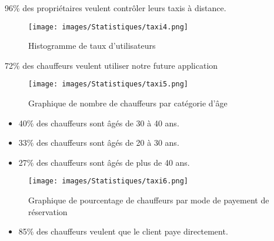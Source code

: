 {\begin{minipage}[c]{.65\linewidth}
 \end{minipage}\hfill
\begin{minipage}[c]{.35\linewidth}
96\% des propriétaires veulent contrôler leurs taxis à distance.
\end{minipage}



\begin{minipage}[c]{.6\linewidth}
\begin{figure}[H]
\centering
\texttt{[image: images/Statistiques/taxi4.png]}
\caption{Histogramme de taux d'utilisateurs}
\end{figure}

 \end{minipage}\hfill
\begin{minipage}[c]{.4\linewidth}
72\%  des chauffeurs veulent utiliser notre future application
\end{minipage}


\begin{minipage}[c]{.6\linewidth}
\begin{figure}[H]
\centering
\texttt{[image: images/Statistiques/taxi5.png]}
\caption{Graphique de nombre de chauffeurs par catégorie d'âge}
\end{figure}
 \end{minipage}\hfill
\begin{minipage}[c]{.4\linewidth}
\begin{itemize}
\item 40\% des chauffeurs sont âgés de 30 à 40 ans.

\item 33\% des chauffeurs sont âgés de 20 à 30 ans.

\item 27\% des chauffeurs sont âgés de plus de 40 ans.
\end{itemize}
\end{minipage}



\begin{minipage}[c]{.6\linewidth}
\begin{figure}[H]
\centering
\texttt{[image: images/Statistiques/taxi6.png]}
\caption{Graphique de pourcentage de chauffeurs par mode de payement de réservation}
\end{figure}
 \end{minipage}\hfill
\begin{minipage}[c]{.4\linewidth}
\begin{itemize}
\item 85\% des chauffeurs veulent que le client paye directement.


\end{itemize}
\end{minipage}}
